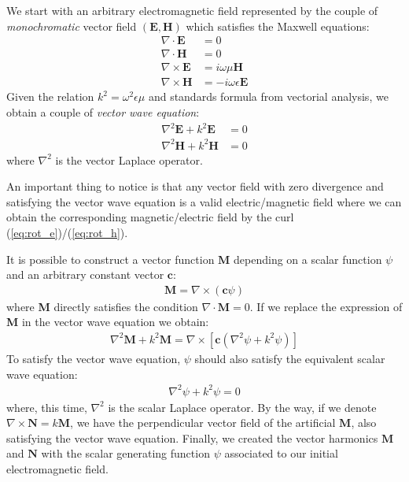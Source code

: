 \documentclass{article}
\numberwithin{equation}{section}
\begin{document}
We start with an arbitrary electromagnetic field represented by the couple of \textit{monochromatic} vector field $(\textbf{E}, \textbf{H})$ which satisfies the Maxwell equations:
\begin{align}
\nabla \cdot \textbf{E} &= 0\\
\nabla \cdot \textbf{H} &= 0\\
\nabla \times \textbf{E} &= i\omega \mu \textbf{H} \label{eq:rot_e} \\
\nabla \times \textbf{H} &= -i\omega \epsilon \textbf{E} \label{eq:rot_h}
\end{align}
Given the relation $k^{2} = \omega ^{2}\epsilon \mu$ and standards formula from vectorial analysis, we obtain a couple of \textit{vector wave equation}:
\begin{align}
\nabla ^{2} \textbf{E} + k^{2}\textbf{E}&=0\\
\nabla ^{2} \textbf{H} + k^{2}\textbf{H}&=0
\end{align}
where $\nabla ^{2}$ is the vector Laplace operator.

An important thing to notice is that any vector field with zero divergence and satisfying the vector wave equation is a valid electric/magnetic field where we can obtain the corresponding magnetic/electric field by the curl (\ref{eq:rot_e})/(\ref{eq:rot_h}).

It is possible to construct a vector function $\textbf{M}$ depending on a scalar function $\psi$ and an arbitrary constant vector $\textbf{c}$:
\begin{align}
\textbf{M} = \nabla \times (\textbf{c}\psi)
\end{align}
where \textbf{M} directly satisfies the condition $\nabla \cdot \textbf{M} = 0$. If we replace the expression of \textbf{M} in the vector wave equation we obtain:
\begin{align}
\nabla ^{2} \textbf{M} + k^{2}\textbf{M} = \nabla \times [\textbf{c}(\nabla ^{2} \psi + k^{2}\psi)]
\end{align}
To satisfy the vector wave equation, $\psi$ should also satisfy the equivalent scalar wave equation:
\begin{align}\label{eq:psi_wave_eq}
\nabla ^{2} \psi + k^{2}\psi = 0
\end{align}
where, this time, $\nabla ^{2}$ is the scalar Laplace operator. By the way, if we denote $\nabla \times \textbf{N} = k \textbf{M}$, we have the perpendicular vector field of the artificial $\textbf{M}$, also satisfying the vector wave equation. Finally, we created the vector harmonics $\textbf{M}$ and $\textbf{N}$ with the scalar generating function $\psi$ associated to our initial electromagnetic field.
\end{document}
